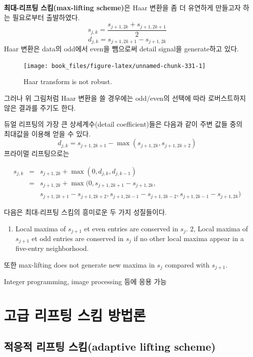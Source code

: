 \documentclass[b5paper,]{scrbook}
\providecommand{\tightlist}{%
  \setlength{\itemsep}{0pt}\setlength{\parskip}{0pt}}
\theoremstyle{plain}
\theoremstyle{definition}
\numberwithin{equation}{section}
\begin{document}
\textbf{최대-리프팅 스킴(max-lifting scheme)}은 Haar 변환을 좀 더 유연하게 만들고자 하는 필요로부터 출발하였다.
\[s_{j,k}=\frac{s_{j+1,2k}+s_{j+1,2k+1}}{2}\]
\[d_{j,k}=s_{j+1,2k+1}-s_{j+1,2k}\]
Haar 변환은 data의 odd에서 even을 뺌으로써 detail signal을 generate하고 있다.

\begin{figure}

{\centering \texttt{[image: book\_files/figure-latex/unnamed-chunk-331-1]} 

}

\caption{Haar transform is not robust.}\label{fig:unnamed-chunk-331}
\end{figure}

그러나 위 그림처럼 Haar 변환을 쓸 경우에는 odd/even의 선택에 따라 로버스트하지 않은 결과를 주기도 한다.

듀얼 리프팅의 가장 큰 상세계수(detail coefficient)들은 다음과 같이 주변 값들 중의 최대값을 이용해 얻을 수 있다.
\[d_{j,k}=s_{j+1,2k+1}-\max(s_{j+1,2k},s_{j+1,2k+2})\]
프라이멀 리프팅으로는

\begin{eqnarray*}
s_{j,k}&=& s_{j+1,2k}+\max (0,d_{j,k},d_{j,k-1})\\
&=&s_{j+1,2k}+\max (0, s_{j+1,2k+1}-s_{j+1,2k}, \\
& &s_{j+1,2k+1}-s_{j+1,2k+2}, s_{j+1,2k-1}-s_{j+1,2k-2}, s_{j+1,2k-1}-s_{j+1,2k})
\end{eqnarray*}

다음은 최대-리프팅 스킴의 흥미로운 두 가지 성질들이다.

\begin{enumerate}
\def\labelenumi{\arabic{enumi}.}
\tightlist
\item
  Local maxima of \(s_{j+1}\) et even entries are conserved in \(s_{j}\).
  2, Local maxima of \(s_{j+1}\) et odd entries are conserved in \(s_{j}\) if no other local maxima appear in a five-entry neighborhood.
\end{enumerate}

또한 max-lifting does not generate new maxima in \(s_{j}\) compared with \(s_{j+1}\).

Integer programming, image processing 등에 응용 가능

\hypertarget{advlifting}{%
\chapter{고급 리프팅 스킴 방법론}\label{advlifting}}

\hypertarget{--adaptive-lifting-scheme}{%
\section{적응적 리프팅 스킴(adaptive lifting scheme)}\label{--adaptive-lifting-scheme}}
\end{document}
